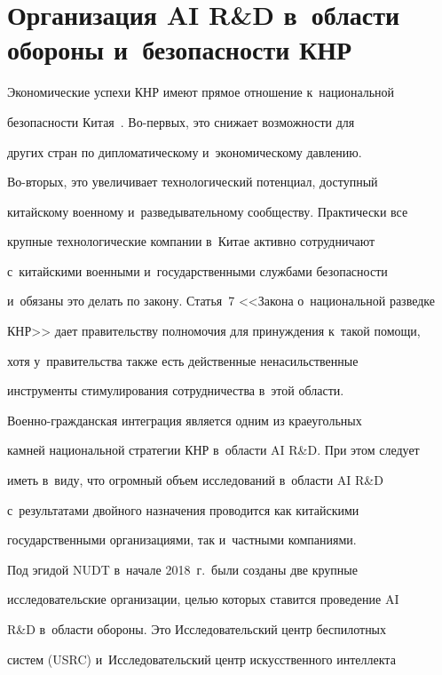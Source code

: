      


\section{Организация AI R\&D в~области обороны и~безопасности КНР}


     


     Экономические успехи КНР имеют прямое отношение к~национальной 


безопас\-ности Китая~\cite{10-b}. Во-пер\-вых, это снижает возможности для 


других стран по дипломатическому и~экономическому давлению.  


Во-вто\-рых, это увеличивает технологический потенциал, доступный 


китайскому военному и~разведывательному сообществу. Практически все 


крупные технологические компании в~Китае активно сотрудничают 


с~китайскими военными и~государственными службами безопасности 


и~обязаны это делать по закону. Статья~7 <<Закона о~национальной разведке 


КНР>> дает правительству полномочия для принуждения к~такой помощи, 


хотя у~правительства также есть действенные ненасильственные 


инструменты стимулирования сотрудничества в~этой об\-ласти.  


Во\-ен\-но-граж\-дан\-ская интеграция является одним из краеугольных 


камней национальной стратегии КНР в~об\-ласти AI R\&D. При этом следует 


иметь в~виду, что огромный объем исследований в~области AI R\&D 


с~результатами двойного назначения проводится как китайскими 


государственными организациями, так и~част\-ны\-ми компаниями.


     


     Под эгидой NUDT в~начале 2018~г.\ были созданы две круп\-ные 


исследовательские организации, \mbox{целью} которых ставится проведение AI 


R\&D в~об\-ласти обороны. Это Исследовательский центр беспилотных 


сис\-тем (USRC) и~Исследовательский центр искусственного интеллекта 


